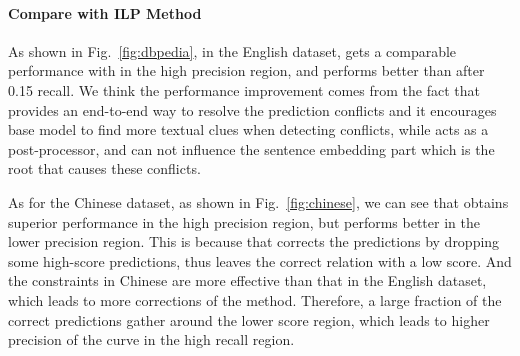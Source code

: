 \paragraph{Compare with ILP Method}
As shown in Fig.~\ref{fig:dbpedia}, in the English dataset,
\SL gets a comparable performance with \ILP in the high precision region, and performs better than \ILP after 0.15 recall.
We think the performance improvement comes from the fact that
\SL provides an end-to-end way to resolve the prediction conflicts and it encourages base model to find more textual clues when detecting conflicts,
while \ILP acts as a post-processor, 
and can not influence the sentence embedding part which is the root that causes these conflicts.


As for the Chinese dataset, as shown in Fig.~\ref{fig:chinese}, we can see that \SL obtains superior performance in the high precision region, but \ILP performs better in the lower precision region.
This is because that \ILP corrects the predictions by dropping some high-score predictions, thus leaves the correct relation with a low score.
And the constraints in Chinese are more effective than that in the English dataset, which leads to more corrections of the \ILP method.
Therefore, a large fraction of the correct predictions gather around the lower score region, which leads to higher precision of the \ILP curve in the high recall region.


